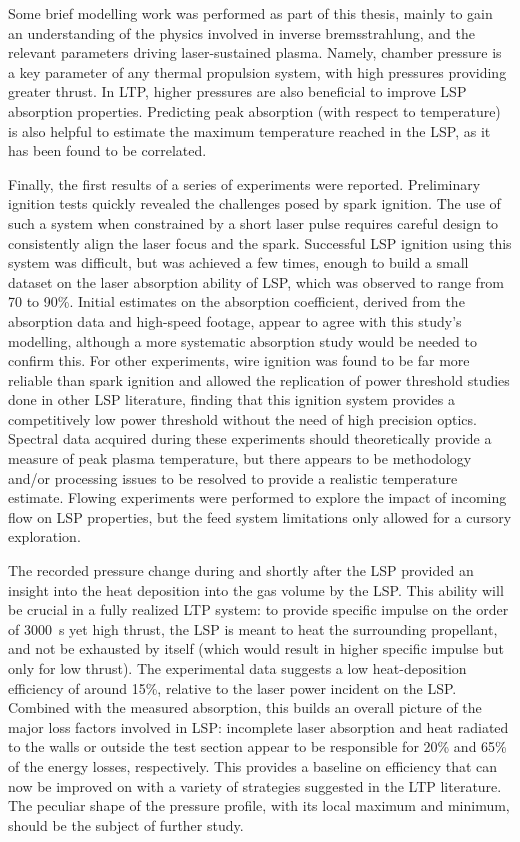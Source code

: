     Some brief modelling work was performed as part of this thesis, mainly to gain an understanding of the physics involved in inverse bremsstrahlung, and the relevant parameters driving laser-sustained plasma. Namely, chamber pressure is a key parameter of any thermal propulsion system, with high pressures providing greater thrust. In LTP, higher pressures are also beneficial to improve LSP absorption properties. Predicting peak absorption (with respect to temperature) is also helpful to estimate the maximum temperature reached in the LSP, as it has been found to be correlated.

    Finally, the first results of a series of experiments were reported. Preliminary ignition tests quickly revealed the challenges posed by spark ignition. The use of such a system when constrained by a short laser pulse requires careful design to consistently align the laser focus and the spark. Successful LSP ignition using this system was difficult, but was achieved a few times, enough to build a small dataset on the laser absorption ability of LSP, which was observed to range from 70 to 90\%. Initial estimates on the absorption coefficient, derived from the absorption data and high-speed footage, appear to agree with this study's modelling, although a more systematic absorption study would be needed to confirm this. For other experiments, wire ignition was found to be far more reliable than spark ignition and allowed the replication of power threshold studies done in other LSP literature, finding that this ignition system provides a competitively low power threshold without the need of high precision optics. Spectral data acquired during these experiments should theoretically provide a measure of peak plasma temperature, but there appears to be methodology and/or processing issues to be resolved to provide a realistic temperature estimate. Flowing experiments were performed to explore the impact of incoming flow on LSP properties, but the feed system limitations only allowed for a cursory exploration.
    
    The recorded pressure change during and shortly after the LSP provided an insight into the heat deposition into the gas volume by the LSP. This ability will be crucial in a fully realized LTP system: to provide specific impulse on the order of \qty{3000}{s} yet high thrust, the LSP is meant to heat the surrounding propellant, and not be exhausted by itself (which would result in higher specific impulse but only for low thrust). The experimental data suggests a low heat-deposition efficiency of around 15\%, relative to the laser power incident on the LSP. Combined with the measured absorption, this builds an overall picture of the major loss factors involved in LSP: incomplete laser absorption and heat radiated to the walls or outside the test section appear to be responsible for 20\% and 65\% of the energy losses, respectively. This provides a baseline on efficiency that can now be improved on with a variety of strategies suggested in the LTP literature. The peculiar shape of the pressure profile, with its local maximum and minimum, should be the subject of further study.


